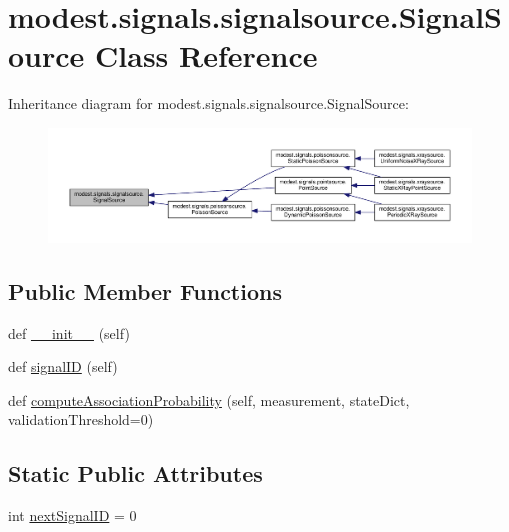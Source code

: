 \hypertarget{classmodest_1_1signals_1_1signalsource_1_1SignalSource}{}\section{modest.\+signals.\+signalsource.\+Signal\+Source Class Reference}
\label{classmodest_1_1signals_1_1signalsource_1_1SignalSource}


Inheritance diagram for modest.\+signals.\+signalsource.\+Signal\+Source\+:
\nopagebreak
\begin{figure}[H]
\begin{center}
\leavevmode
\includegraphics[width=350pt]{classmodest_1_1signals_1_1signalsource_1_1SignalSource__inherit__graph}
\end{center}
\end{figure}
\subsection*{Public Member Functions}
\begin{DoxyCompactItemize}
\item 
def \hyperlink{classmodest_1_1signals_1_1signalsource_1_1SignalSource_abc71be8fa60c2431ee68d4b7752684f0}{\+\_\+\+\_\+init\+\_\+\+\_\+} (self)
\item 
def \hyperlink{classmodest_1_1signals_1_1signalsource_1_1SignalSource_a9a64c6a9c2954f6ad61e4ca3518ea8ab}{signal\+ID} (self)
\item 
def \hyperlink{classmodest_1_1signals_1_1signalsource_1_1SignalSource_a3d32dbed840ea9ac775b226f0a654831}{compute\+Association\+Probability} (self, measurement, state\+Dict, validation\+Threshold=0)
\end{DoxyCompactItemize}
\subsection*{Static Public Attributes}
\begin{DoxyCompactItemize}
\item 
int \hyperlink{classmodest_1_1signals_1_1signalsource_1_1SignalSource_a453eafb550b551adbec0903deb63dfce}{next\+Signal\+ID} = 0
\end{DoxyCompactItemize}
